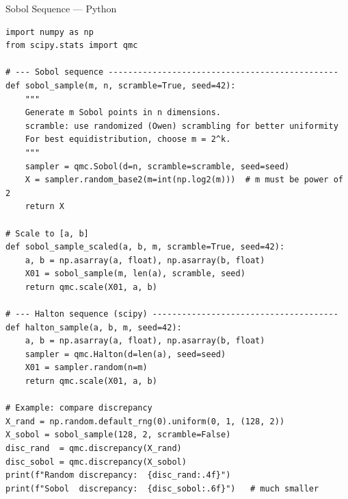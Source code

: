 \documentclass[aspectratio=169,10pt]{beamer}
\begin{document}
\begin{frame}[fragile]{Sobol Sequence --- Python}
  \begin{lstlisting}[style=python, caption={Sobol sequence using scipy.stats.qmc}]
import numpy as np
from scipy.stats import qmc

# --- Sobol sequence -----------------------------------------------
def sobol_sample(m, n, scramble=True, seed=42):
    """
    Generate m Sobol points in n dimensions.
    scramble: use randomized (Owen) scrambling for better uniformity
    For best equidistribution, choose m = 2^k.
    """
    sampler = qmc.Sobol(d=n, scramble=scramble, seed=seed)
    X = sampler.random_base2(m=int(np.log2(m)))  # m must be power of 2
    return X

# Scale to [a, b]
def sobol_sample_scaled(a, b, m, scramble=True, seed=42):
    a, b = np.asarray(a, float), np.asarray(b, float)
    X01 = sobol_sample(m, len(a), scramble, seed)
    return qmc.scale(X01, a, b)

# --- Halton sequence (scipy) --------------------------------------
def halton_sample(a, b, m, seed=42):
    a, b = np.asarray(a, float), np.asarray(b, float)
    sampler = qmc.Halton(d=len(a), seed=seed)
    X01 = sampler.random(n=m)
    return qmc.scale(X01, a, b)

# Example: compare discrepancy
X_rand = np.random.default_rng(0).uniform(0, 1, (128, 2))
X_sobol = sobol_sample(128, 2, scramble=False)
disc_rand  = qmc.discrepancy(X_rand)
disc_sobol = qmc.discrepancy(X_sobol)
print(f"Random discrepancy:  {disc_rand:.4f}")
print(f"Sobol  discrepancy:  {disc_sobol:.6f}")   # much smaller
  \end{lstlisting}
\end{frame}
\end{document}
